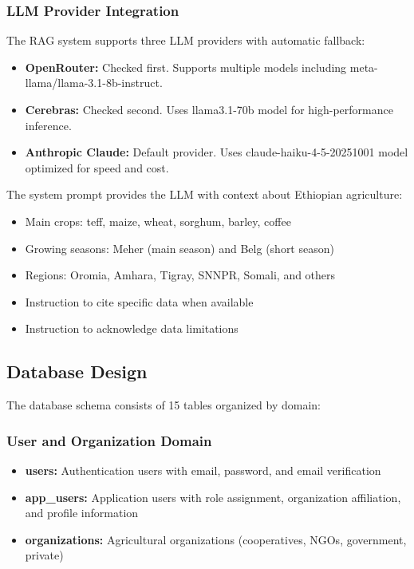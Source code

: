 \subsubsection{LLM Provider Integration}

The RAG system supports three LLM providers with automatic fallback:
\begin{itemize}
  \item \textbf{OpenRouter:} Checked first. Supports multiple models including meta-llama/llama-3.1-8b-instruct.
  \item \textbf{Cerebras:} Checked second. Uses llama3.1-70b model for high-performance inference.
  \item \textbf{Anthropic Claude:} Default provider. Uses claude-haiku-4-5-20251001 model optimized for speed and cost.
\end{itemize}

The system prompt provides the LLM with context about Ethiopian agriculture:
\begin{itemize}
  \item Main crops: teff, maize, wheat, sorghum, barley, coffee
  \item Growing seasons: Meher (main season) and Belg (short season)
  \item Regions: Oromia, Amhara, Tigray, SNNPR, Somali, and others
  \item Instruction to cite specific data when available
  \item Instruction to acknowledge data limitations
\end{itemize}

\subsection{Database Design}

The database schema consists of 15 tables organized by domain:

\subsubsection{User and Organization Domain}
\begin{itemize}
  \item \textbf{users:} Authentication users with email, password, and email verification
  \item \textbf{app\_users:} Application users with role assignment, organization affiliation, and profile information
  \item \textbf{organizations:} Agricultural organizations (cooperatives, NGOs, government, private)
\end{itemize}


